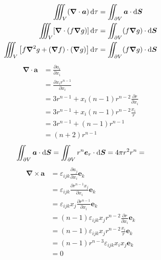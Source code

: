 \begin{align*}
    \iiint_V (\boldsymbol{\nabla} \cdot \boldsymbol{a})  \dif\tau
    &= \iint_{\partial V} \boldsymbol{a} \cdot \dif \boldsymbol{S}\\
    \iiint_V [\boldsymbol{\nabla} \cdot (f\boldsymbol{\nabla}g)]  \dif\tau
    &= \iint_{\partial V} (f\boldsymbol{\nabla}g) \cdot \dif \boldsymbol{S}\\
    \iiint_V\left[f\boldsymbol{\nabla}^2g+(\boldsymbol{\nabla}f)\cdot(\boldsymbol{\nabla}g)\right]\dif\tau
    &= \iint_{\partial V} (f\boldsymbol{\nabla}g) \cdot \dif \boldsymbol{S}
\end{align*}
\begin{align*}
    \boldsymbol{\nabla}\cdot\boldsymbol{a}&=\frac{\partial a_i}{\partial x_i}\\
    &=\frac{\partial x_ir^{n-1}}{\partial x_i}\\
    &=3r^{n-1}
    +x_i(n-1)r^{n-2}\frac{\partial r}{\partial x_i}\\
    &=3r^{n-1}
    +x_i(n-1)r^{n-2}\frac{ x_i}{ r}\\
    &=3r^{n-1}
    +(n-1)r^{n-1}\\
    &=(n+2)r^{n-1}
\end{align*}
\begin{align*}
    \iint_{\partial V} \boldsymbol{a} \cdot \dif \boldsymbol{S}
    =\iint_{\partial V} {r^n}\boldsymbol{e}_r \cdot \dif \boldsymbol{S}
    =4\pi r^2r^n=
\end{align*}
\begin{align*}
    \boldsymbol{\nabla}\times\boldsymbol{a}&=\varepsilon_{ijk}\frac{\partial a_j}{\partial x_i}\boldsymbol{e}_k\\
    &=\varepsilon_{ijk}\frac{\partial r^{n-1}x_j}{\partial x_i}\boldsymbol{e}_k\\
    &=\varepsilon_{ijk}x_j\frac{\partial r^{n-1}}{\partial x_i}\boldsymbol{e}_k\\
    &=(n-1)\varepsilon_{ijk}x_jr^{n-2}\frac{\partial r}{\partial x_i}\boldsymbol{e}_k\\
    &=(n-1)\varepsilon_{ijk}x_jr^{n-2}\frac{x_i}{r}\boldsymbol{e}_k\\
    &=(n-1)r^{n-3}\varepsilon_{ijk}{x_i}x_j\boldsymbol{e}_k\\
    &=0
\end{align*}
